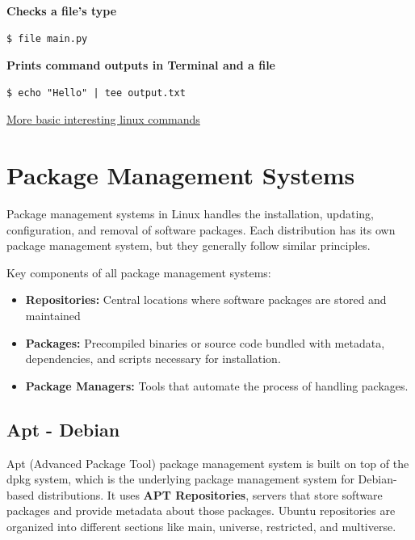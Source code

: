 \documentclass{article}
\newenvironment{codetemplate}[1][]{%
  \mybasecolorbox[#1]
  \itshape
}{%
  \endmybasecolorbox
}
\begin{document}
\textbf{Checks a file's type}
\begin{codetemplate}{}
\begin{verbatim}
$ file main.py
\end{verbatim}
\end{codetemplate}

\textbf{Prints command outputs in Terminal and a file}
\begin{codetemplate}{}
\begin{verbatim}
$ echo "Hello" | tee output.txt
\end{verbatim}
\end{codetemplate}

\href{https://www.hostinger.com/tutorials/linux-commands}{More basic interesting linux commands}

\newpage
\section{Package Management Systems}

Package management systems in Linux handles the installation, updating, configuration, and removal of software packages. Each distribution has its own package management system, but they generally follow similar principles.

Key components of all package management systems:

\begin{itemize}
    \item \textbf{Repositories:} Central locations where software packages are stored and maintained
    \item \textbf{Packages:} Precompiled binaries or source code bundled with metadata, dependencies, and scripts necessary for installation.
    \item \textbf{Package Managers:} Tools that automate the process of handling packages.
\end{itemize}

\subsection{Apt - Debian}

Apt (Advanced Package Tool) package management system is built on top of the dpkg system, which is the underlying package management system for Debian-based distributions. It uses \textbf{APT Repositories}, servers that store software packages and provide metadata about those packages. Ubuntu repositories are organized into different sections like main, universe, restricted, and multiverse.
\end{document}
